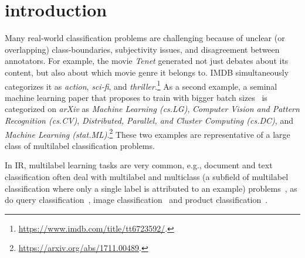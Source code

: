 
\section{introduction}
\label{sec:org662677c}


Many real-world classification problems are challenging because of unclear (or overlapping) class-boundaries, subjectivity issues, and disagreement between annotators.
For example, the movie \textit{Tenet} generated not just debates about its content, but also about which movie genre it belongs to. IMDB simultaneously categorizes it as \textit{action}, \textit{sci-fi}, and \textit{thriller}.\footnote{\url{https://www.imdb.com/title/tt6723592/}.}
As a second example, a seminal machine learning paper that proposes to train with bigger batch sizes~\citep{bigBSArxiv} is categorized on \textit{arXiv} as \textit{Machine Learning (cs.LG)},
\textit{Computer Vision and Pattern Recognition (cs.CV)}, \textit{Distributed,
Parallel, and Cluster Computing (cs.DC)}, and \textit{Machine Learning
(stat.ML)}.\footnote{\url{https://arxiv.org/abs/1711.00489}.}
These two examples are representative of a large class of multilabel classification problems.
%
\begin{comment}
\begin{enumerate}[label=(\arabic*),leftmargin=*]
\item The possibility of assigning more than one label to a single instance is desirable (i.e., labels are not mutually exclusive).
\item The instance being labeled needs to be inspected or consumed in its entirety before a full set of class labels can be determined. For example, it requires an entire viewing of the movie \textit{Tenet} to determine if the label \textit{romance} is appropriate, as it is arguably the underlying driver of the protagonists.
\item The number of labels differs per instance, making the number of labels to assign at inference time unknown.
\end{enumerate}
\end{comment}
%
In \ac{IR}, multilabel learning tasks are very common, e.g., document and text classification often deal with multilabel and multiclass (a subfield of multilabel classification where only a single label is attributed to an example) problems~\cite{IRClassStat, textCategorization, statTextCategorization, documentClassification}, as do query classification~\cite{queryClassification, introIR}, image classification~\cite{imageClassification, faceDetection} and product classification~\cite{Amoualian2020SIGIR2E}. 


